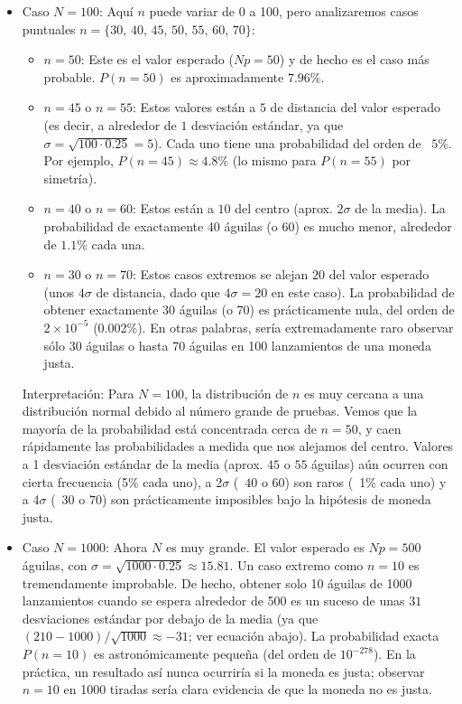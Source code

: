 \documentclass[11pt,letterpaper]{article}
\begin{document}
\begin{itemize}
    
    Interpretación: La distribución es perfectamente simétrica alrededor de $n=2.5$ (el valor esperado $Np=2.5$; en la práctica los valores más probables son 2 o 3 éxitos, cada uno con ~31.3\% de probabilidad). Resultados extremos como $n=0$ o $n=5$ son poco probables (~3\%). Con $N=5$ la aproximación normal aún no es muy precisa, pero comenzamos a ver una forma aproximadamente acampanada en las probabilidades.
    
  \item Caso $N=100$: Aquí $n$ puede variar de 0 a 100, pero analizaremos casos puntuales $n=\{30,\,40,\,45,\,50,\,55,\,60,\,70\}$:
  \begin{itemize}
      \item $n=50$: Este es el valor esperado ($Np=50$) y de hecho es el caso más probable. $P(n=50)$ es aproximadamente $7.96\%$.  
    \item $n=45$ o $n=55$: Estos valores están a $5$ de distancia del valor esperado (es decir, a alrededor de $1$ desviación estándar, ya que $\sigma=\sqrt{100\cdot0.25}=5$). Cada uno tiene una probabilidad del orden de ~$5\%$. Por ejemplo, $P(n=45)\approx4.8\%$ (lo mismo para $P(n=55)$ por simetría).
    \item $n=40$ o $n=60$: Estos están a $10$ del centro (aprox. $2\sigma$ de la media). La probabilidad de exactamente 40 águilas (o 60) es mucho menor, alrededor de $1.1\%$ cada una.
    \item $n=30$ o $n=70$: Estos casos extremos se alejan $20$ del valor esperado (unos $4\sigma$ de distancia, dado que $4\sigma = 20$ en este caso). La probabilidad de obtener exactamente 30 águilas (o 70) es prácticamente nula, del orden de $2\times10^{-5}$ (0.002\%). En otras palabras, sería extremadamente raro observar sólo 30 águilas o hasta 70 águilas en 100 lanzamientos de una moneda justa.
  \end{itemize}
    
    
    Interpretación: Para $N=100$, la distribución de $n$ es muy cercana a una distribución normal debido al número grande de pruebas. Vemos que la mayoría de la probabilidad está concentrada cerca de $n=50$, y caen rápidamente las probabilidades a medida que nos alejamos del centro. Valores a 1 desviación estándar de la media (aprox. $45$ o $55$ águilas) aún ocurren con cierta frecuencia (5\% cada uno), a 2$\sigma$ (~$40$ o $60$) son raros (~1\% cada uno) y a 4$\sigma$ (~$30$ o $70$) son prácticamente imposibles bajo la hipótesis de moneda justa.
    
  \item Caso $N=1000$: Ahora $N$ es muy grande. El valor esperado es $Np = 500$ águilas, con $\sigma = \sqrt{1000\cdot0.25}\approx 15.81$. Un caso extremo como $n=10$ es tremendamente improbable. De hecho, obtener solo 10 águilas de 1000 lanzamientos cuando se espera alrededor de 500 es un suceso de unas $31$ desviaciones estándar por debajo de la media (ya que $(210-1000)/\sqrt{1000}\approx -31$; ver ecuación abajo). La probabilidad exacta $P(n=10)$ es astronómicamente pequeña (del orden de $10^{-278}$). En la práctica, un resultado así nunca ocurriría si la moneda es justa; observar $n=10$ en 1000 tiradas sería clara evidencia de que la moneda no es justa.
\end{itemize}
\end{document}
